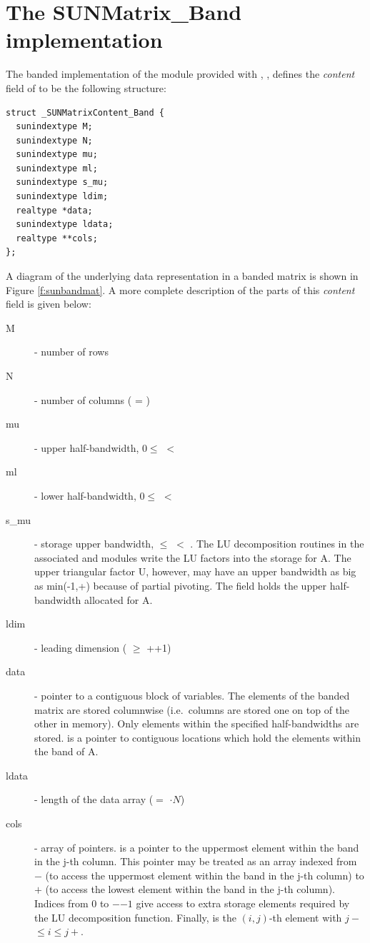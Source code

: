 \section{The SUNMatrix\_Band implementation}\label{ss:sunmat_band}

The banded implementation of the {\sunmatrix} module provided with
{\sundials}, {\sunmatband}, defines the {\em content} field
of  to be the following structure:
\begin{verbatim}
struct _SUNMatrixContent_Band {
  sunindextype M;
  sunindextype N;
  sunindextype mu;
  sunindextype ml;
  sunindextype s_mu;
  sunindextype ldim;
  realtype *data;
  sunindextype ldata;
  realtype **cols;
};
\end{verbatim}
A diagram of the underlying data representation in a banded matrix is
shown in Figure \ref{f:sunbandmat}.  A more complete description of the
parts of this \emph{content} field is given below:
\begin{description}
  \item[M] - number of rows
  \item[N] - number of columns ( = )
  \item[mu] - upper half-bandwidth, $0 \le$  $<$ 
  \item[ml] - lower half-bandwidth, $0 \le$  $<$ 
  \item[s\_mu] - storage upper bandwidth,  $\le$  $<$ .
    The LU decomposition routines in the associated {\sunlinsolband}
    and {\sunlinsollapband} modules write the LU factors into the
    storage for A. The upper triangular factor U, however, may have
    an upper bandwidth as big as min(-1,+) because of
    partial pivoting. The  field holds the upper
  half-bandwidth allocated for A.
  \item[ldim] - leading dimension ( $\ge$ ++1)
  \item[data] - pointer to a contiguous block of  variables.
    The elements of the banded matrix are stored columnwise
    (i.e.~columns are stored one on top of the other in memory). Only
    elements within the specified half-bandwidths are stored.
     is a pointer to  contiguous locations
    which hold the elements within the band of A.
  \item[ldata] - length of the data array
    ($=$ $\cdot N$)
  \item[cols] - array of pointers.  is a pointer to the
    uppermost element within the band in the j-th column. This pointer
    may be treated as an array indexed from $-$ (to
    access the uppermost element within the band in the j-th column)
    to $+$ (to access the lowest element within the
    band in the j-th column). Indices from $0$ to
    $-$$-1$ give access to extra storage elements
    required by the LU decomposition function.
    Finally,  is the $(i,j)$-th element with
    $j-$ $\le i \le j+$.
\end{description}
